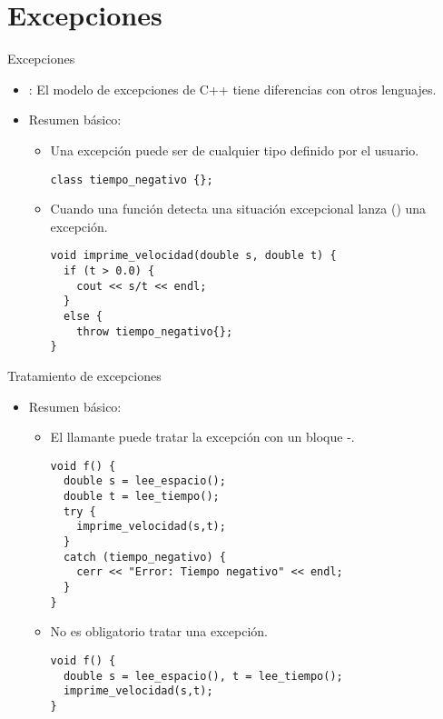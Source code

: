 \section{Excepciones}

\begin{frame}[fragile]{Excepciones}
\begin{itemize}
  \item {}: El modelo de excepciones de C++ tiene diferencias con otros lenguajes.
  \item Resumen básico:
    \begin{itemize}
      \item Una excepción puede ser de cualquier tipo definido por el usuario.
\begin{lstlisting}
class tiempo_negativo {};
\end{lstlisting}
      \item Cuando una función detecta una situación excepcional lanza () una excepción.
\begin{lstlisting}
void imprime_velocidad(double s, double t) {
  if (t > 0.0) {
    cout << s/t << endl;
  }
  else {
    throw tiempo_negativo{};
}
\end{lstlisting}
    \end{itemize}
\end{itemize}
\end{frame}

\begin{frame}[fragile]{Tratamiento de excepciones}
\begin{itemize}
  \item Resumen básico:
    \begin{itemize}
      \item El llamante puede tratar la excepción con un bloque -.
\begin{lstlisting}
void f() {
  double s = lee_espacio();
  double t = lee_tiempo();
  try {
    imprime_velocidad(s,t);
  }
  catch (tiempo_negativo) {
    cerr << "Error: Tiempo negativo" << endl;
  }
}
\end{lstlisting}
      \item No es obligatorio tratar una excepción.
\begin{lstlisting}
void f() {
  double s = lee_espacio(), t = lee_tiempo();
  imprime_velocidad(s,t);
}
\end{lstlisting}
    \end{itemize}
\end{itemize}
\end{frame}

